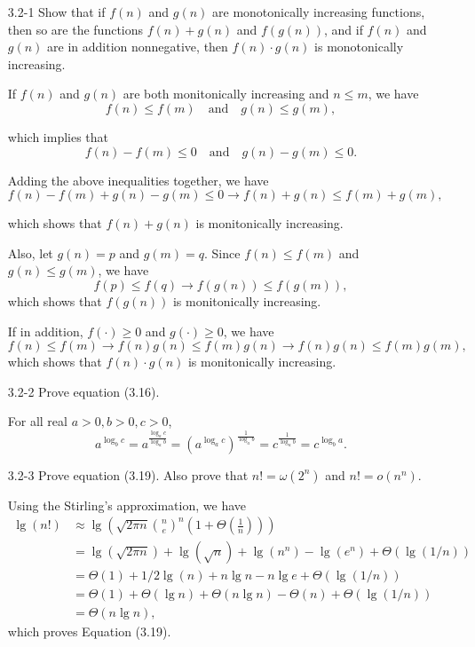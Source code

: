 \documentclass{report}
\makeatletter
\renewenvironment{framed}{%
 \def\FrameCommand##1{\hskip\@totalleftmargin
 \fboxsep=\FrameSep\fbox{##1}}%
 \MakeFramed {\advance\hsize-\width
   \@totalleftmargin\z@ \linewidth\hsize
   \@setminipage}}%
 {\par\unskip\endMakeFramed}
\makeatother
\begin{document}
\begin{enumerate}

\item[3.2{-}1]{Show that if $f(n)$ and $g(n)$ are monotonically increasing
functions, then so are the functions $f(n) + g(n)$ and $f(g(n))$, and if
$f(n)$ and $g(n)$ are in addition nonnegative, then $f(n) \cdot g(n)$ is
monotonically increasing.}

\begin{framed}
If $f(n)$ and $g(n)$ are both monitonically increasing and $n \le m$, we have
\[
f(n) \le f(m) \quad \text{and} \quad g(n) \le g(m),
\]

which implies that
\[
f(n) - f(m) \le 0 \quad \text{and} \quad g(n) - g(m) \le 0.
\]

Adding the above inequalities together, we have
\[
f(n) - f(m) + g(n) - g(m) \le 0 \rightarrow
f(n) + g(n) \le f(m) + g(m),
\]

which shows that $f(n) + g(n)$ is monitonically increasing.

Also, let $g(n) = p$ and $g(m) = q$.
Since $f(n) \le f(m)$ and $g(n) \le g(m)$, we have
\[
f(p) \le f(q) \rightarrow f(g(n)) \le f(g(m)),
\]
which shows that $f(g(n))$ is monitonically increasing.

If in addition, $f(\cdot) \ge 0$ and $g(\cdot) \ge 0$, we have
\[
f(n) \le f(m) \rightarrow f(n) g(n) \le f(m) g(n) \rightarrow f(n) g(n) \le f(m) g(m),
\]
which shows that $f(n) \cdot g(n)$ is monitonically increasing.
\end{framed}

\item[3.2{-}2]{Prove equation (3.16).}

\begin{framed}
For all real $a > 0, b > 0, c > 0$,
\[
a^{\log_b c} = a^{\frac{\log_a c}{\log_a b}}
             = \left(a^{\log_a c}\right)^{\frac{1}{\log_a b}}
             = c^{\frac{1}{\log_a b}}
             = c^{\log_b a}.
\]
\end{framed}

\item[3.2{-}3]{Prove equation (3.19).
Also prove that $n! = \omega(2^n)$ and $n! = o(n^n)$.}

\begin{framed}
Using the Stirling's approximation, we have
\begin{equation*}
\begin{split}
  \lg(n!) & \approx \lg\left(\sqrt{2 \pi n} \binom{n}{e}^n \left(1 + \Theta\left(\frac{1}{n}\right)\right)\right)\\
          & = \lg{(\sqrt{2 \pi n})} + \lg(\sqrt{n}) + \lg(n^n) - \lg(e^n) + \Theta(\lg(1/n))\\
          & = \Theta(1) + 1/2 \lg(n) + n \lg n - n \lg e + \Theta(\lg(1/n))\\
          & = \Theta(1) + \Theta(\lg n) + \Theta(n \lg n) - \Theta(n) + \Theta(\lg(1/n))\\
          & = \Theta(n \lg n),
\end{split}
\end{equation*}
which proves Equation (3.19).


\end{framed}
\end{enumerate}
\end{document}

